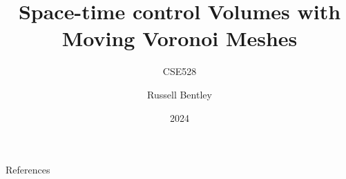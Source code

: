 \documentclass{beamer}
\title{Space-time control Volumes with Moving Voronoi Meshes}
\subtitle{CSE528}
\author{Russell Bentley}
\institute{Stony Brook}
\date{2024}
\begin{document}
\frame{\titlepage}




\begin{frame}[allowframebreaks]{References}
    \tiny
    \printbibliography
\end{frame}
\end{document}
